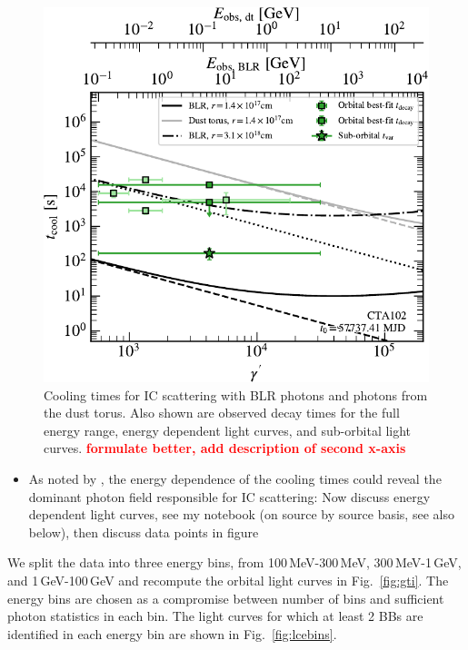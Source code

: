 \documentclass[twocolumn]{aastex62}
\newcommand{\todo}[1]{\textbf{\textcolor{red}{#1}}}
\begin{document}
\begin{figure}
    \centering
    \includegraphics[width = .9\linewidth]{figures/tcool_CTA102_t001_LogParabola_ring.pdf}
    \caption{Cooling times for IC scattering with BLR photons and photons from the dust torus. Also shown are observed decay times for the full energy range, energy dependent light curves, and sub-orbital light curves. \todo{formulate better, add description of second x-axis}}
    \label{fig:tcool}
\end{figure}

\label{sec:tcool}
    \begin{itemize}
  \item 
As noted by \citet{2012ApJ...758L..15D}, the energy dependence of the cooling times could reveal the dominant photon field responsible for IC scattering:  Now discuss energy dependent light curves, see my notebook (on source by source basis, see also below), then discuss data points in figure
\end{itemize}



We split the data into three energy bins, from 100\,MeV-300\,MeV, 300\,MeV-1\,GeV, and 1\,GeV-100\,GeV and recompute the orbital light curves in Fig.~\ref{fig:gti}. 
The energy bins are chosen as a compromise between number of bins and sufficient photon statistics in each bin. 
The light curves for which at least 2 BBs are identified in each energy bin are shown in Fig.~\ref{fig:lcebins}.
\end{document}
